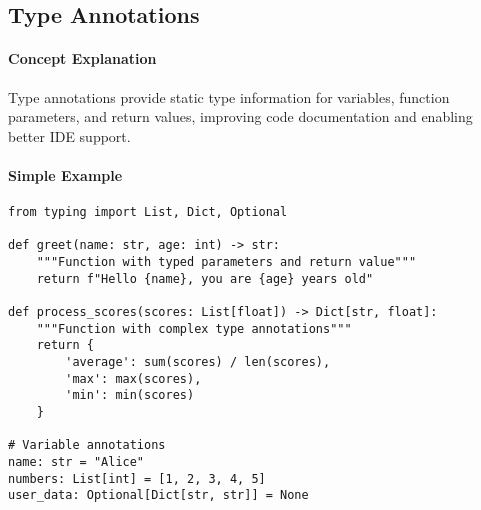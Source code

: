 \subsection{Type Annotations}

\paragraph{Concept Explanation}
Type annotations provide static type information for variables, function parameters, and return values, improving code documentation and enabling better IDE support.

\paragraph{Simple Example}
\begin{lstlisting}[caption=Type Annotation Examples]
from typing import List, Dict, Optional

def greet(name: str, age: int) -> str:
    """Function with typed parameters and return value"""
    return f"Hello {name}, you are {age} years old"

def process_scores(scores: List[float]) -> Dict[str, float]:
    """Function with complex type annotations"""
    return {
        'average': sum(scores) / len(scores),
        'max': max(scores),
        'min': min(scores)
    }

# Variable annotations
name: str = "Alice"
numbers: List[int] = [1, 2, 3, 4, 5]
user_data: Optional[Dict[str, str]] = None
\end{lstlisting}

